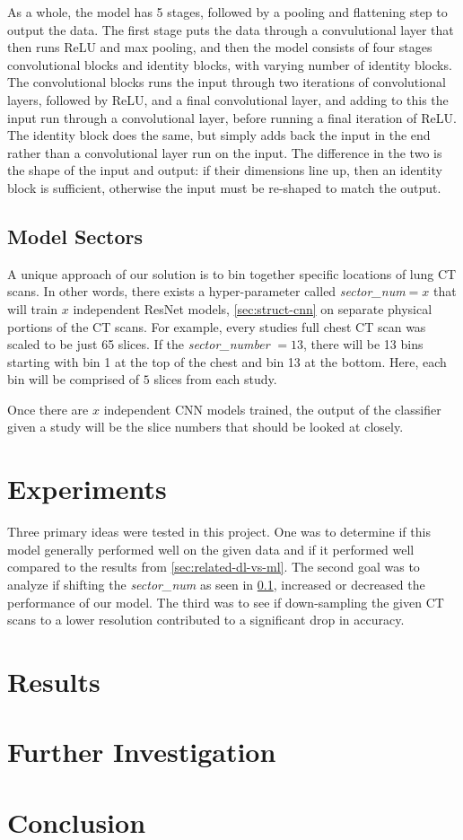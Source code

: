 \documentclass[10pt,twocolumn,letterpaper]{article}
\begin{document}
         As a whole, the model has 5 stages, followed by a pooling and flattening step to output the data. The first stage puts the data through a convulutional layer that then runs ReLU and max pooling, and then the model consists of four stages convolutional blocks and identity blocks, with varying number of identity blocks. The convolutional blocks runs the input through two iterations of convolutional layers, followed by ReLU, and a final convolutional layer, and adding to this the input run through a convolutional layer, before running a final iteration of ReLU. The identity block does the same, but simply adds back the input in the end rather than a convolutional layer run on the input. The difference in the two is the shape of the input and output: if their dimensions line up, then an identity block is sufficient, otherwise the input must be re-shaped to match the output.

   \subsection{Model Sectors} \label{sec:struct-sector}

        A unique approach of our solution is to bin together specific locations of lung CT scans. In other words, there exists
        a hyper-parameter called {\it sector\_num}$=x$ that will train $x$ independent ResNet models, \ref{sec:struct-cnn} on separate
        physical portions of the CT scans. For example, every studies full chest CT scan was scaled to be just 65 slices. If the {\it sector\_number} $=13$,
        there will be 13 bins starting with bin 1 at the top of the chest and bin 13 at the bottom. Here, each bin will be comprised
        of $5$ slices from each study.

        Once there are $x$ independent CNN models trained, the output of the classifier given a study will
        be the slice numbers that should be looked at closely.

\section{Experiments} \label{sec:experiments}
   Three primary ideas were tested in this project. One was to determine if this model generally performed well on the given data and if it performed well
    compared to the results from \ref{sec:related-dl-vs-ml}. The second goal was to analyze if shifting the 
   {\it sector\_num} as seen in \ref{sec:struct-sector}, increased or decreased the performance of our model. The third was to see if down-sampling the 
   given CT scans to a lower resolution contributed to a significant drop in accuracy.
   
\section{Results} \label{sec:results}

\section{Further Investigation} \label{sec:further}

\section{Conclusion} \label{sec:conclusion}

{\small


}
\end{document}
